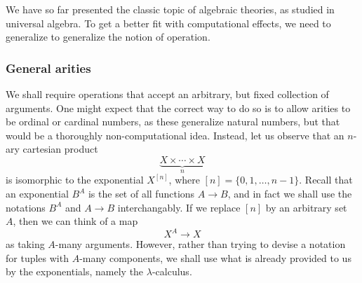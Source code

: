 \documentclass{amsart}
\newcommand{\set}[1]{\{#1\}} %
\begin{document}
We have so far presented the classic topic of algebraic theories, as studied in
universal algebra. To get a better fit with computational effects, we need to
generalize to generalize the notion of operation.

\subsubsection{General arities}
\label{sec:general-arities}

We shall require operations that accept an arbitrary, but fixed collection of
arguments. One might expect that the correct way to do so is to allow arities to
be ordinal or cardinal numbers, as these generalize natural numbers, but that
would be a thoroughly non-computational idea. Instead, let us observe that an
$n$-ary cartesian product
%
\begin{equation*}
  \underbrace{X \times \cdots \times X}_{n}
\end{equation*}
%
is isomorphic to the exponential $X^{[n]}$, where
$[n] = \set{0, 1, \ldots, n-1}$. Recall that an exponential $B^A$ is the set of
all functions $A \to B$, and in fact we shall use the notations $B^A$ and
$A \to B$ interchangably. If we replace $[n]$ by an arbitrary set~$A$, then we
can think of a map
%
\begin{equation*}
  X^A \to X
\end{equation*}
%
as taking $A$-many arguments. However, rather than trying to devise a notation
for tuples with $A$-many components, we shall use what is already provided to us
by the exponentials, namely the $\lambda$-calculus.
\end{document}
